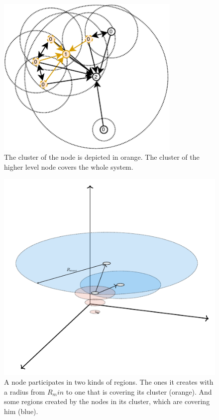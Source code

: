 \documentclass[a4paper,11pt,oneside]{report}
\begin{document}
\begin{figure}[!h] 
\centering
\includegraphics[width=250pt]{figures/ClusterBunch-Cluster}
\caption{ The cluster of the node is depicted in orange. The cluster of the higher level node covers the whole system. }
\label{fig:ClusterBunch-Cluster}
\end{figure}

\begin{figure}[!h] 
\centering
\includegraphics[width=350pt]{figures/regions/ellipsis}
\caption{ A node participates in two kinds of regions. The ones it creates with a radius from $R_min$ to one that is covering its cluster (orange). And some regions created by the nodes in its cluster, which are covering him (blue).}
\label{fig:RegionCreation}
\end{figure}
\end{document}
